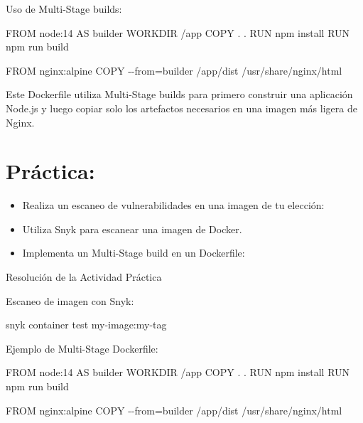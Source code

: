 \documentclass[
  a4paper,
  DIV=11,
  numbers=noendperiod,
  onepage,
  openany]{scrreprt}
\newenvironment{Shaded}{\begin{snugshade}}{\end{snugshade}}
\newcommand{\ExtensionTok}[1]{\textcolor[rgb]{0.00,0.23,0.31}{#1}}
\newcommand{\KeywordTok}[1]{\textcolor[rgb]{0.00,0.23,0.31}{#1}}
\newcommand{\NormalTok}[1]{\textcolor[rgb]{0.00,0.23,0.31}{#1}}
\newcommand{\OperatorTok}[1]{\textcolor[rgb]{0.37,0.37,0.37}{#1}}
\providecommand{\tightlist}{%
  \setlength{\itemsep}{0pt}\setlength{\parskip}{0pt}}\usepackage{longtable,booktabs,array}
\begin{document}
Uso de Multi-Stage builds:

\begin{Shaded}
\begin{Highlighting}[]
\KeywordTok{FROM}\NormalTok{ node:14 }\KeywordTok{AS}\NormalTok{ builder}
\KeywordTok{WORKDIR}\NormalTok{ /app}
  \KeywordTok{COPY}\NormalTok{ . .}
  \KeywordTok{RUN} \ExtensionTok{npm}\NormalTok{ install}
  \KeywordTok{RUN} \ExtensionTok{npm}\NormalTok{ run build}

  \KeywordTok{FROM}\NormalTok{ nginx:alpine}
  \KeywordTok{COPY} \OperatorTok{{-}{-}from=builder}\NormalTok{ /app/dist /usr/share/nginx/html}
\end{Highlighting}
\end{Shaded}

Este Dockerfile utiliza Multi-Stage builds para primero construir una
aplicación Node.js y luego copiar solo los artefactos necesarios en una
imagen más ligera de Nginx.

\hypertarget{pruxe1ctica-3}{%
\section{Práctica:}\label{pruxe1ctica-3}}

\begin{itemize}
\tightlist
\item
  Realiza un escaneo de vulnerabilidades en una imagen de tu elección:
\item
  Utiliza Snyk para escanear una imagen de Docker.
\item
  Implementa un Multi-Stage build en un Dockerfile:
\end{itemize}

Resolución de la Actividad Práctica

Escaneo de imagen con Snyk:

\begin{Shaded}
\begin{Highlighting}[]
\ExtensionTok{snyk}\NormalTok{ container test my{-}image:my{-}tag}
\end{Highlighting}
\end{Shaded}

Ejemplo de Multi-Stage Dockerfile:

\begin{Shaded}
\begin{Highlighting}[]

\KeywordTok{FROM}\NormalTok{ node:14 }\KeywordTok{AS}\NormalTok{ builder}
\KeywordTok{WORKDIR}\NormalTok{ /app}
  \KeywordTok{COPY}\NormalTok{ . .}
  \KeywordTok{RUN} \ExtensionTok{npm}\NormalTok{ install}
  \KeywordTok{RUN} \ExtensionTok{npm}\NormalTok{ run build}

  \KeywordTok{FROM}\NormalTok{ nginx:alpine}
  \KeywordTok{COPY} \OperatorTok{{-}{-}from=builder}\NormalTok{ /app/dist /usr/share/nginx/html}
\end{Highlighting}
\end{Shaded}
\end{document}

